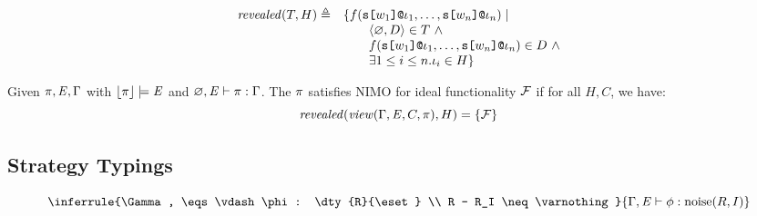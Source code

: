 \begin{definition}[Revelation]
  $$
  \begin{array}{ll}
    \mathit{revealed}(T,H) \triangleq & \{ f(\texttt{s[}w_1\texttt{]}\texttt{@}\iota_1,\ldots,\texttt{s[}w_n\texttt{]}\texttt{@}\iota_n) \mid  \\
      & \qquad \langle \varnothing, D \rangle \in T\ \wedge\\
      & \qquad f(\texttt{s[}w_1\texttt{]}\texttt{@}\iota_1,\ldots,\texttt{s[}w_n\texttt{]}\texttt{@}\iota_n) \in D\ \wedge \\
      & \qquad \exists 1 \le i \le n . \iota_i \in H \} 
  \end{array}
  $$
\end{definition}

\begin{theorem}
  Given $\pi, \mathit{E}, \Gamma$ with $\lfloor \pi \rfloor \models \mathit{E}$ and $\varnothing, \mathit{E} \vdash \pi : \Gamma$.
  The $\pi$ satisfies {NIMO} for ideal functionality $\mathcal{F}$ if for all $H,C$, we have:
  $$
  \mathit{revealed}(\mathit{view}(\Gamma,\mathit{E},C,\pi),H) = \{ \mathcal{F} \}
  $$
\end{theorem}

\subsection{Strategy Typings}

$$
\inferrule
    {\Gamma, \eqs \vdash \phi : \dty{R}{\eset} \\ R - R_I \neq \varnothing}
    {\Gamma, \eqs \vdash \phi : \noise(R,I)}
$$

